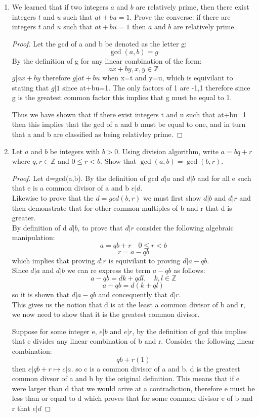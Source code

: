 \documentclass[11pt]{article}
\theoremstyle{definition}  %
\newcommand{\Z}{\mathbb{Z}}
\begin{document}
\begin{enumerate}
\item We learned that if two integers $a$ and $b$ are relatively prime, then there exist integers $t$ and $u$ such that $at + bu = 1$.
Prove the converse: if there are integers $t$ and $u$ such that $at + bu = 1$ then $a$ and $b$ are relatively prime.
\begin{proof}
Let the gcd of a and b be denoted as the letter g:
\[
  \gcd(a,b)=g
\]
By the definition of g for any linear combination of the form: \[
  ax+by, x,y\in \Z
\]
$g|ax+by$ therefore $g|at+bu$ when x=t and y=u, which is equivilant to stating that $g|1$ since at+bu=1. The only factors of 1 are -1,1 therefore since g is the greatest common factor this implies that g must be equal to 1.

Thus we have shown that if there exist integers t and u such that at+bu=1 then this implies that the gcd of a and b must be equal to one, and in turn that a and b are classified as being relativley prime.

\end{proof}
\item Let $a$ and $b$ be integers with $b >0$. Using division algorithm, write $a = bq + r$ where $q, r \in \Z$ and $0 \leq r < b$. Show that $\gcd(a,b) = \gcd(b, r)$.
\begin{proof}
Let d=gcd(a,b). By the definition of gcd $d|a$ and $d|b$ and for all e such that e is a common divisor of a and b $e|d$. \\
Likewise to prove that the $d=gcd(b,r)$ we must first show $d|b$ and $d|r$ and then demonstrate that for other common multiples of b and r that d is greater. \\
By definition of d $d|b$, to prove that $d|r$ consider the following algebraic manipulation:
\[
  a=qb+r \quad 0\leq r <b
\]
\[
  r=a-qb
\]
which implies that proving $d|r$ is equivilant to proving $d|a-qb$.\\
Since $d|a$ and $d|b$ we can re express the term $a-qb$ as follows:
\[
  a-qb=dk+qdl,\quad k,l\in \Z
\]
\[
  a-qb=d(k+ql)
\]
so it is shown that $d|a-qb$ and concequently that $d|r$. \\
This gives us the notion that d is at the least a common divisor of b and r, we now need to show that it is the greatest common divisor.

Suppose for some integer e, $e|b$ and $e|r$,
by the definition of gcd this implies that e divides any linear combination of b and r. Consider the following linear combination:
\[
  qb+r(1)
\]
then $e|qb+r\mapsto c|a$. so c is a common divisor of a and b. d is the greatest common divsor of a and b by the original definition. This means that if e were larger than d that we would arive at a contradiction, therefore e must be less than or equal to d which proves that for some common divisor e of b and r that $e|d$


\end{proof}
\end{enumerate}
\end{document}
